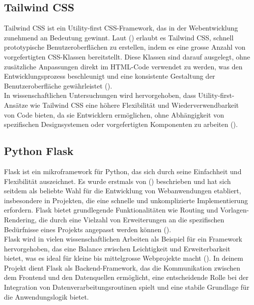 \documentclass[a4paper, 12pt]{scrartcl}
\begin{document}
\subsection{Tailwind CSS}
Tailwind CSS ist ein Utility-first CSS-Framework, das in der Webentwicklung zunehmend an Bedeutung gewinnt. Laut (\cite{Rifandi2022}) erlaubt es Tailwind CSS, schnell prototypische Benutzeroberflächen zu erstellen, indem es eine grosse Anzahl von vorgefertigten CSS-Klassen bereitstellt. Diese Klassen sind darauf ausgelegt, ohne zusätzliche Anpassungen direkt im HTML-Code verwendet zu werden, was den Entwicklungsprozess beschleunigt und eine konsistente Gestaltung der Benutzeroberfläche gewährleistet (\cite{Rifandi2022}).\\[1em] In wissenschaftlichen Untersuchungen wird hervorgehoben, dass Utility-first-Ansätze wie Tailwind CSS eine höhere Flexibilität und Wiederverwendbarkeit von Code bieten, da sie Entwicklern ermöglichen, ohne Abhängigkeit von spezifischen Designsystemen oder vorgefertigten Komponenten zu arbeiten (\cite{Wang2023}).

\subsection{Python Flask}
Flask ist ein mikroframework für Python, das sich durch seine Einfachheit und Flexibilität auszeichnet. Es wurde erstmals von (\cite{Relan2019}) beschrieben und hat sich seitdem als beliebte Wahl für die Entwicklung von Webanwendungen etabliert, insbesondere in Projekten, die eine schnelle und unkomplizierte Implementierung erfordern. Flask bietet grundlegende Funktionalitäten wie Routing und Vorlagen-Rendering, die durch eine Vielzahl von Erweiterungen an die spezifischen Bedürfnisse eines Projekts angepasst werden können (\cite{Chauhan2019}).\\[1em]Flask wird in vielen wissenschaftlichen Arbeiten als Beispiel für ein Framework hervorgehoben, das eine Balance zwischen Leichtigkeit und Erweiterbarkeit bietet, was es ideal für kleine bis mittelgrosse Webprojekte macht (\cite{PAZDRIY2023}). In deinem Projekt dient Flask als Backend-Framework, das die Kommunikation zwischen dem Frontend und den Datenquellen ermöglicht, eine entscheidende Rolle bei der Integration von Datenverarbeitungsroutinen spielt und eine stabile Grundlage für die Anwendungslogik bietet.
\end{document}
